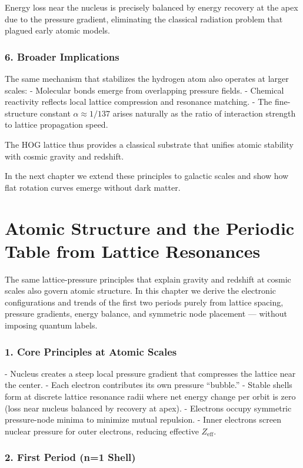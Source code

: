 \documentclass[11pt,a4paper]{book}
\begin{document}
Energy loss near the nucleus is precisely balanced by energy recovery at the apex due to the pressure gradient, eliminating the classical radiation problem that plagued early atomic models.

\subsection{6. Broader Implications}
The same mechanism that stabilizes the hydrogen atom also operates at larger scales:
- Molecular bonds emerge from overlapping pressure fields.
- Chemical reactivity reflects local lattice compression and resonance matching.
- The fine-structure constant \( \alpha \approx 1/137 \) arises naturally as the ratio of interaction strength to lattice propagation speed.

The HOG lattice thus provides a classical substrate that unifies atomic stability with cosmic gravity and redshift.

In the next chapter we extend these principles to galactic scales and show how flat rotation curves emerge without dark matter.

\chapter{Atomic Structure and the Periodic Table from Lattice Resonances}

The same lattice-pressure principles that explain gravity and redshift at cosmic scales also govern atomic structure. In this chapter we derive the electronic configurations and trends of the first two periods purely from lattice spacing, pressure gradients, energy balance, and symmetric node placement — without imposing quantum labels.

\subsection{1. Core Principles at Atomic Scales}
- Nucleus creates a steep local pressure gradient that compresses the lattice near the center.
- Each electron contributes its own pressure “bubble.”
- Stable shells form at discrete lattice resonance radii where net energy change per orbit is zero (loss near nucleus balanced by recovery at apex).
- Electrons occupy symmetric pressure-node minima to minimize mutual repulsion.
- Inner electrons screen nuclear pressure for outer electrons, reducing effective \( Z_{\text{eff}} \).

\subsection{2. First Period (n=1 Shell)}
\end{document}
